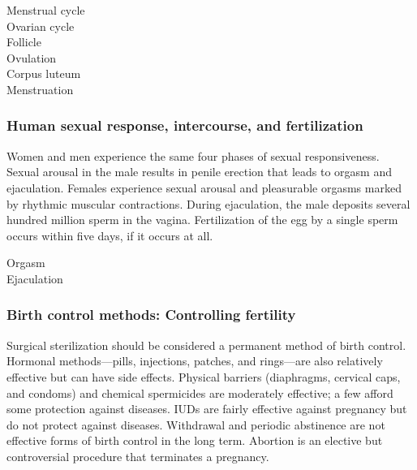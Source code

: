 \documentclass[11pt]{article}
\begin{document}
\begin{description}
\item[{Menstrual cycle}] 

\item[{Ovarian cycle}] 

\item[{Follicle}] 

\item[{Ovulation}] 

\item[{Corpus luteum}] 

\item[{Menstruation}] 
\end{description}

\subsubsection{Human sexual response, intercourse, and fertilization}
\label{sec:org0a3c06d}
Women and men experience the same four phases of sexual responsiveness. Sexual
arousal in the male results in penile erection that leads to orgasm and
ejaculation. Females experience sexual arousal and pleasurable orgasms marked by
rhythmic muscular contractions. During ejaculation, the male deposits several
hundred million sperm in the vagina. Fertilization of the egg by a single sperm
occurs within five days, if it occurs at all.

\begin{description}
\item[{Orgasm}] 

\item[{Ejaculation}] 
\end{description}

\subsubsection{Birth control methods: Controlling fertility}
\label{sec:org2a01029}
Surgical sterilization should be considered a permanent method of birth control.
Hormonal methods---pills, injections, patches, and rings---are also relatively
effective but can have side effects. Physical barriers (diaphragms, cervical
caps, and condoms) and chemical spermicides are moderately effective; a few
afford some protection against diseases. IUDs are fairly effective against
pregnancy but do not protect against diseases. Withdrawal and periodic
abstinence are not effective forms of birth control in the long term. Abortion
is an elective but controversial procedure that terminates a pregnancy.
\end{document}

